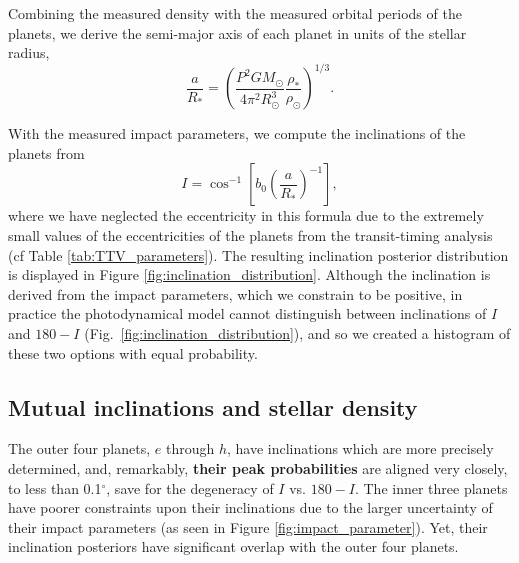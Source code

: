 \documentclass[twocolumn]{aastex63}
\begin{document}
Combining the measured density with the measured orbital periods of the planets,
we derive the semi-major axis of each planet in units of the stellar radius,
\begin{equation}
    \frac{a}{R_*} = \left(\frac{P^2 G M_\odot}{4\pi^2 R_\odot^3} \frac{\rho_*}{\rho_\odot}\right)^{1/3}.
\end{equation}

With the measured impact parameters, we compute the inclinations of the planets
from \textbf{\citep{Winn2010}}
\begin{equation}
    I = \cos^{-1}\left[ b_0
        \left(\frac{a}{R_*}\right)^{-1}\right],
\end{equation}
where we have neglected the eccentricity in this formula due to the extremely
small values of the eccentricities of the planets from the transit-timing
analysis (cf Table \ref{tab:TTV_parameters}).  The resulting inclination
posterior distribution is displayed in Figure \ref{fig:inclination_distribution}.
Although the inclination is derived from the impact parameters, which we constrain
to be positive, in practice the photodynamical model cannot distinguish between
inclinations of $I$ and $180-I$ (Fig.\ \ref{fig:inclination_distribution}), and so we created a histogram of these two options
with equal probability.

\subsection{Mutual inclinations and stellar density}

The outer four planets, $e$ through $h$, have inclinations which are more
precisely determined, and, remarkably, \textbf{their peak probabilities} are aligned
very closely, to less than 0.1$^\circ$, save for the degeneracy of $I$ vs.
$180-I$.  The inner three planets have poorer
constraints upon their inclinations due to the larger uncertainty of their
impact parameters (as seen in Figure \ref{fig:impact_parameter}).  Yet, their inclination posteriors have significant overlap
with the outer four planets.
\end{document}

